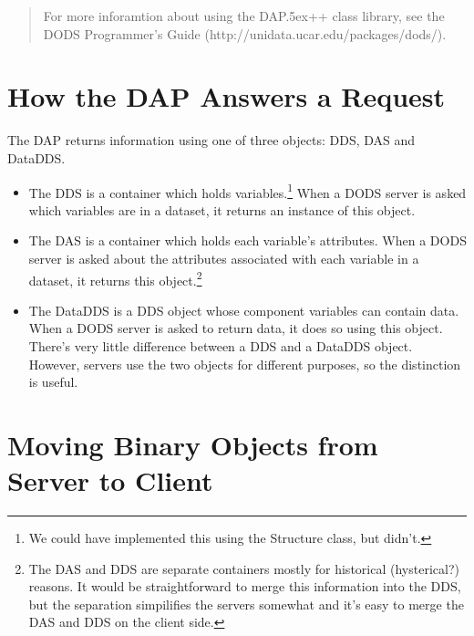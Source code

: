 \documentclass{article}
\newcommand{\dap}{\rm {\small DAP}\raise.5ex\hbox{\footnotesize ++}\xspace}
\begin{document}
\begin{quote}
For more inforamtion about using the \dap class library, see the DODS
Programmer's Guide (http://unidata.ucar.edu/packages/dods/).
\end{quote}

\section{How the DAP Answers a Request}
\label{sec:answer}

The DAP returns information using one of three objects: DDS, DAS and DataDDS.
\begin{itemize}
\item The DDS is a container which holds variables.\footnote{We could have
  implemented this using the Structure class, but didn't.} When a DODS server
is asked which variables are in a dataset, it returns an instance of this
object.
  
\item The DAS is a container which holds each variable's attributes. When a
  DODS server is asked about the attributes associated with each variable in
  a dataset, it returns this object.\footnote{The DAS and DDS are separate
    containers mostly for historical (hysterical?) reasons. It would be
    straightforward to merge this information into the DDS, but the
    separation simpilifies the servers somewhat and it's easy to merge the
    DAS and DDS on the client side.}

\item The DataDDS is a DDS object whose component variables can contain data.
  When a DODS server is asked to return data, it does so using this object.
  There's very little difference between a DDS and a DataDDS object. However,
  servers use the two objects for different purposes, so the distinction is
  useful.
\end{itemize}

\section{Moving Binary Objects from Server to Client}
\label{sec:binary}
\end{document}

